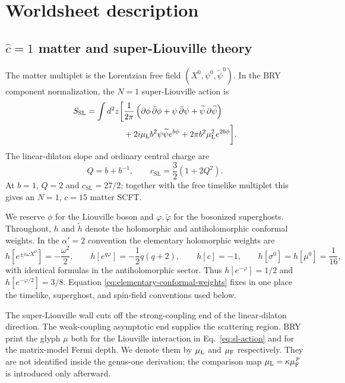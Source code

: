 \documentclass[11pt]{article}
\newcommand{\ap}{\alpha'}
\newcommand{\SL}{\mathrm{SL}}
\begin{document}
\section{Worldsheet description}

\subsection{\texorpdfstring{$\widehat c=1$}{c-hat=1} matter and
super-Liouville theory}

The matter multiplet is the Lorentzian free field
$(X^0,\psi^0,\widetilde\psi^0)$.  In the BRY component normalization, the
$N=1$ super-Liouville action is
\begin{align}
 S_{\SL}=\int d^2z\bigg[
 &\frac{1}{2\pi}\left(
 \partial\phi\,\bar\partial\phi+
 \psi\,\bar\partial\psi+
 \widetilde\psi\,\partial\widetilde\psi\right)\notag\\
 &+2i\mu_{\rm L} b^2\psi\widetilde\psi e^{b\phi}
 +2\pi b^2\mu_{\rm L}^2e^{2b\phi}\bigg].
 \label{eq:sl-action}
\end{align}
The linear-dilaton slope and ordinary central charge are
\begin{equation}
 Q=b+b^{-1},
 \qquad
 c_{\SL}=\frac32(1+2Q^2).
 \label{eq:sl-central-charge}
\end{equation}
At $b=1$, $Q=2$ and $c_{\SL}=27/2$; together with the free timelike
multiplet this gives an $N=1$, $c=15$ matter SCFT.

We reserve $\phi$ for the Liouville boson and
$\varphi,\widetilde\varphi$ for the bosonized superghosts.  Throughout,
$h$ and $\widetilde h$ denote the holomorphic and antiholomorphic conformal
weights.  In the $\ap=2$ convention the elementary holomorphic weights are
\begin{equation}
 h\!\left[e^{\pm i\omega X^0}\right]=-\frac{\omega^2}{2},
 \qquad
 h\!\left[e^{q\varphi}\right]=-\frac12q(q+2),
 \qquad
 h[c]=-1,
 \qquad
 h[\sigma^0]=h[\mu^0]=\frac1{16},
 \label{eq:elementary-conformal-weights}
\end{equation}
with identical formulas in the antiholomorphic sector.  Thus
$h[e^{-\varphi}]=1/2$ and $h[e^{-\varphi/2}]=3/8$.  Equation
\eqref{eq:elementary-conformal-weights} fixes in one place the timelike,
superghost, and spin-field conventions used below.

The super-Liouville wall cuts off the strong-coupling end of the linear-dilaton
direction.  The weak-coupling asymptotic end supplies the scattering region.
BRY print the glyph $\mu$ both for the Liouville interaction in
Eq.~\eqref{eq:sl-action} and for the matrix-model Fermi depth.  We denote
them by $\mu_{\rm L}$ and $\mu_{\rm F}$ respectively.  They are not
identified inside the genus-one derivation; the comparison map
$\mu_{\rm L}=\kappa\mu_{\rm F}^{\,p}$ is introduced only afterward.
\end{document}
